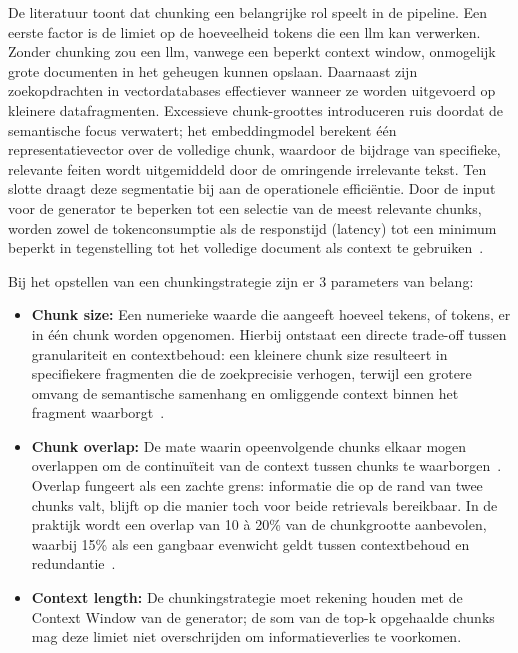 De literatuur toont dat chunking een belangrijke rol speelt in de pipeline. Een eerste factor is de limiet op de hoeveelheid tokens die een \gls{llm} kan verwerken. Zonder chunking zou een \gls{llm}, vanwege een beperkt context window, onmogelijk grote documenten in het geheugen kunnen opslaan. Daarnaast zijn zoekopdrachten in vectordatabases effectiever wanneer ze worden uitgevoerd op kleinere datafragmenten. Excessieve chunk-groottes introduceren ruis doordat de semantische focus verwatert; het embeddingmodel berekent één representatievector over de volledige chunk, waardoor de bijdrage van specifieke, relevante feiten wordt uitgemiddeld door de omringende irrelevante tekst. Ten slotte draagt deze segmentatie bij aan de operationele efficiëntie. Door de input voor de generator te beperken tot een selectie van de meest relevante chunks, worden zowel de tokenconsumptie als de responstijd (latency) tot een minimum beperkt in tegenstelling tot het volledige document als context te gebruiken~\autocite{Moro2025,Amiri2025}.

Bij het opstellen van een chunkingstrategie zijn er 3 parameters van belang:

\begin{itemize}
  \item \textbf{Chunk size:} Een numerieke waarde die aangeeft hoeveel tekens, of tokens, er in één chunk worden opgenomen. Hierbij ontstaat een directe trade-off tussen granulariteit en contextbehoud: een kleinere chunk size resulteert in specifiekere fragmenten die de zoekprecisie verhogen, terwijl een grotere omvang de semantische samenhang en omliggende context binnen het fragment waarborgt~\autocite{Guenther2024}.
  \item \textbf{Chunk overlap:} De mate waarin opeenvolgende chunks elkaar mogen overlappen om de continuïteit van de context tussen chunks te waarborgen~\autocite{GomezCabello2025}. Overlap fungeert als een zachte grens: informatie die op de rand van twee chunks valt, blijft op die manier toch voor beide retrievals bereikbaar. In de praktijk wordt een overlap van 10 à 20\% van de chunkgrootte aanbevolen, waarbij 15\% als een gangbaar evenwicht geldt tussen contextbehoud en redundantie~\autocite{Glukhov2026}.
  \item \textbf{Context length:} De chunkingstrategie moet rekening houden met de Context Window van de generator; de som van de top-k opgehaalde chunks mag deze limiet niet overschrijden om informatieverlies te voorkomen.
\end{itemize}

